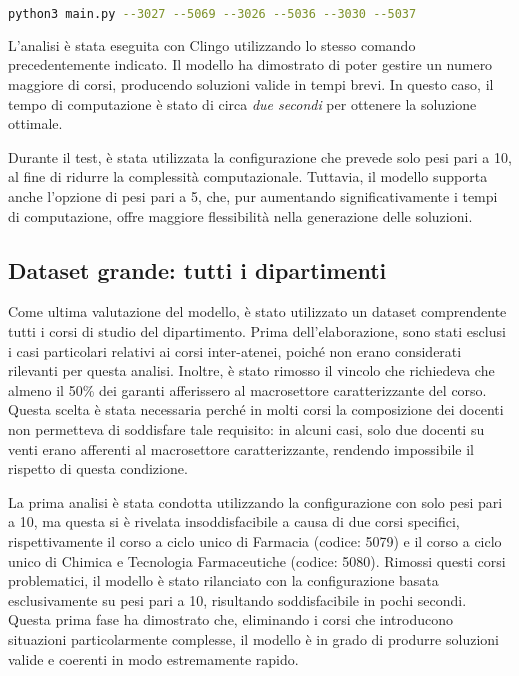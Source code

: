 \begin{lstlisting}[language=bash]
 python3 main.py --3027 --5069 --3026 --5036 --3030 --5037
\end{lstlisting}

L'analisi è stata eseguita con Clingo utilizzando lo stesso comando precedentemente 
indicato. Il modello ha dimostrato di poter gestire un numero maggiore di corsi, producendo 
soluzioni valide in tempi brevi. In questo caso, il tempo di computazione è stato di circa 
\textit{due secondi} per ottenere la soluzione ottimale.

Durante il test, è stata utilizzata la configurazione che prevede solo pesi pari a 10, al 
fine di ridurre la complessità computazionale. Tuttavia, il modello supporta anche l'opzione 
di pesi pari a 5, che, pur aumentando significativamente i tempi di computazione, offre 
maggiore flessibilità nella generazione delle soluzioni.


\subsection{Dataset grande: tutti i dipartimenti}
\label{sec:dataset-tutti-dipartimenti}

Come ultima valutazione del modello, è stato utilizzato un dataset 
comprendente tutti i corsi di studio del dipartimento. Prima dell'elaborazione, sono stati 
esclusi i casi particolari relativi ai corsi inter-atenei, poiché non erano considerati 
rilevanti per questa analisi. Inoltre, è stato rimosso il vincolo che richiedeva che almeno 
il 50\% dei garanti afferissero al macrosettore caratterizzante del corso. Questa scelta è 
stata necessaria perché in molti corsi la composizione dei docenti non permetteva di 
soddisfare tale requisito: in alcuni casi, solo due docenti su venti erano afferenti al 
macrosettore caratterizzante, rendendo impossibile il rispetto di questa condizione.

La prima analisi è stata condotta utilizzando la configurazione con solo pesi pari a 10, 
ma questa si è rivelata insoddisfacibile a causa di due corsi specifici, rispettivamente 
il corso a ciclo unico di Farmacia (codice: 5079) e il corso a ciclo unico di Chimica e 
Tecnologia Farmaceutiche (codice: 5080). Rimossi questi corsi problematici, il modello 
è stato rilanciato con la configurazione basata esclusivamente su pesi pari a 10, 
risultando soddisfacibile in pochi secondi. Questa prima fase ha dimostrato che, 
eliminando i corsi che introducono situazioni particolarmente complesse, il modello 
è in grado di produrre soluzioni valide e coerenti in modo estremamente rapido.

